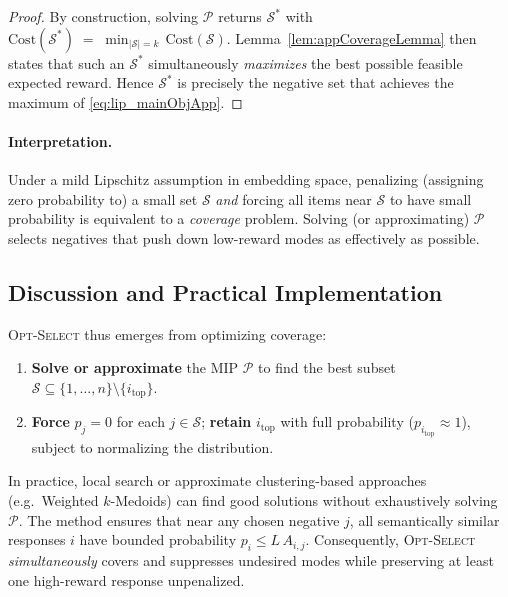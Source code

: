 \begin{proof}
By construction, solving \(\mathcal{P}\) returns \(\mathcal{S}^*\) with
\(\displaystyle
\mathrm{Cost}(\mathcal{S}^*)
\;=\;
\min_{|\mathcal{S}|=k}\,\mathrm{Cost}(\mathcal{S}).
\)
Lemma~\ref{lem:appCoverageLemma} then states that such an \(\mathcal{S}^*\) simultaneously \emph{maximizes} the best possible feasible expected reward. Hence \(\mathcal{S}^*\) is precisely the negative set that achieves the maximum of \eqref{eq:lip_mainObjApp}.
\end{proof}

\paragraph{Interpretation.} 
Under a mild Lipschitz assumption in embedding space, penalizing (assigning zero probability to) a small set \(\mathcal{S}\) \emph{and} forcing all items near \(\mathcal{S}\) to have small probability is equivalent to a \emph{coverage} problem. Solving (or approximating) \(\mathcal{P}\) selects negatives that push down low-reward modes as effectively as possible.

\vspace{-0.05in}
\subsection{Discussion and Practical Implementation}

\vspace{-0.05in}
\textsc{Opt-Select} thus emerges from optimizing coverage: 
\begin{enumerate}[leftmargin=1.25em, itemsep=0.5em]
    \item \textbf{Solve or approximate} the MIP \(\mathcal{P}\) to find the best subset \(\mathcal{S}\subseteq\{1,\dots,n\}\setminus\{i_{\mathrm{top}}\}\).
    \item \textbf{Force} \(p_j=0\) for each \(j\in \mathcal{S}\); \textbf{retain} \(i_{\mathrm{top}}\) with full probability (\(p_{i_{\mathrm{top}}}\approx 1\)), subject to normalizing the distribution. 
\end{enumerate}
In practice, local search or approximate clustering-based approaches (e.g.\ Weighted \(k\)-Medoids) can find good solutions without exhaustively solving \(\mathcal{P}\). The method ensures that near any chosen negative \(j\), all semantically similar responses \(i\) have bounded probability \(p_i \le L\,A_{i,j}\). Consequently, \textsc{Opt-Select} \emph{simultaneously} covers and suppresses undesired modes while preserving at least one high-reward response unpenalized.

